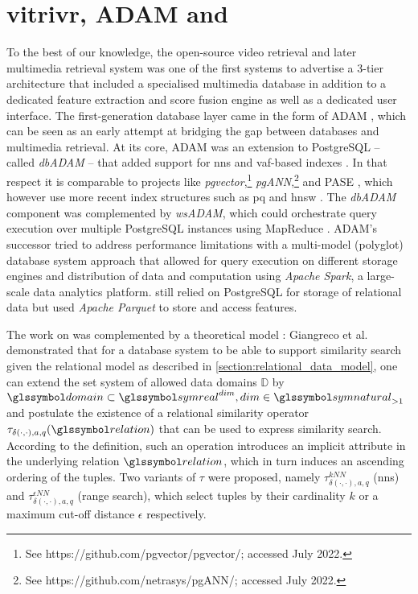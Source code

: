 \section{vitrivr, ADAM and \texorpdfstring{\adampro{}}{ADAMpro}}
\label{section:vitrivr_adam_adampro}
To the best of our knowledge, the open-source \vitrivr{} video retrieval \cite{Rossetto:2016Vitrivr} and later multimedia retrieval \cite{Gasser:2019Multimodal} system was one of the first systems to advertise a 3-tier architecture that included a specialised multimedia database in addition to a dedicated feature extraction and score fusion engine as well as a dedicated user interface. The first-generation database layer came in the form of ADAM \cite{Giangreco:2014Adam}, which can be seen as an early attempt at bridging the gap between databases and multimedia retrieval. At its core, ADAM was an extension to PostgreSQL -- called \emph{dbADAM} -- that added support for \acrshort{nns} and \acrshort{vaf}-based indexes \cite{Weber:1998Va}. In that respect it is comparable to projects like \emph{pgvector},\footnote{See https://github.com/pgvector/pgvector/; accessed July 2022.} \emph{pgANN},\footnote{See https://github.com/netrasys/pgANN/; accessed July 2022.} and PASE \cite{Yang:2020Pase}, which however use more recent index structures such as \acrshort{pq} \cite{Jegou:2010Product} and \acrshort{hnsw} \cite{Malkov:2018Efficient}. The \emph{dbADAM} component was complemented by \emph{wsADAM}, which could orchestrate query execution over multiple PostgreSQL instances using MapReduce \cite{Dean:2008Mapreduce}. ADAM's successor \adampro{} \cite{Giangreco:2016Adam} tried to address performance limitations with a multi-model (polyglot) database system approach that allowed for query execution on different storage engines and distribution of data and computation using \emph{Apache Spark}, a large-scale data analytics platform. \adampro{} still relied on PostgreSQL for storage of relational data but used \emph{Apache Parquet} to store and access features. 

The work on \adampro{} was complemented by a theoretical model \cite{Giangreco:2018Database}: Giangreco et al. demonstrated that for a database system to be able to support similarity search given the relational model as described in \cref{section:relational_data_model}, one can extend the set system of allowed data domains $\mathbb{D}$ by $\domain \subset \symreal^{dim}, dim \in \symnatural_{>1}$ and postulate the existence of a relational similarity operator $\tau_{\delta(\cdot,\cdot),a,q}(\relation)$ that can be used to express similarity search. According to the definition, such an operation introduces an implicit attribute in the underlying relation $\relation$, which in turn induces an ascending ordering of the tuples. Two variants of $\tau$ were proposed, namely $\tau^{kNN}_{\delta(\cdot,\cdot),a,q}$ (\acrshort{nns}) and $\tau^{\epsilon NN}_{\delta(\cdot,\cdot),a,q}$ (range search), which select tuples by their cardinality $k$ or a maximum cut-off distance $\epsilon$ respectively.

